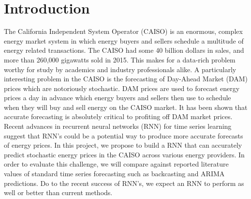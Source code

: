 \documentclass[sigconf]{acmart}
\begin{document}
\section{Introduction}


The California Independent System Operator (CAISO) is an enormous, complex energy market system in which energy buyers and sellers schedule a multitude of energy related transactions. The CAISO had some 40 billion dollars in sales, and more than 260,000 gigawatts sold in 2015\cite{CAenergy2}. This makes for a data-rich problem worthy for study by academics and industry professionals alike. A particularly interesting problem in the CAISO is the forecasting of Day-Ahead Market (DAM) prices which are notoriously stochastic. DAM prices are used to forecast energy prices a day in advance which energy buyers and sellers then use to schedule when they will buy and sell energy on the CAISO market. It has been shown that accurate forecasting is absolutely critical to profiting off DAM market prices\cite{Dowling2017}.\\
Recent advances in recurrent neural networks (RNN) for time series learning suggest that RNN's could be a potential way to produce more accurate forecasts of energy prices. In this project, we propose to build a RNN that can accurately predict stochastic energy prices in the CAISO across various energy providers. In order to evaluate this challenge, we will compare against reported literature values of standard time series forecasting such as backcasting and ARIMA predictions\cite{Conejo2005a}. Do to the recent success of RNN's, we expect an RNN to perform as well or better than current methods. 
\end{document}
